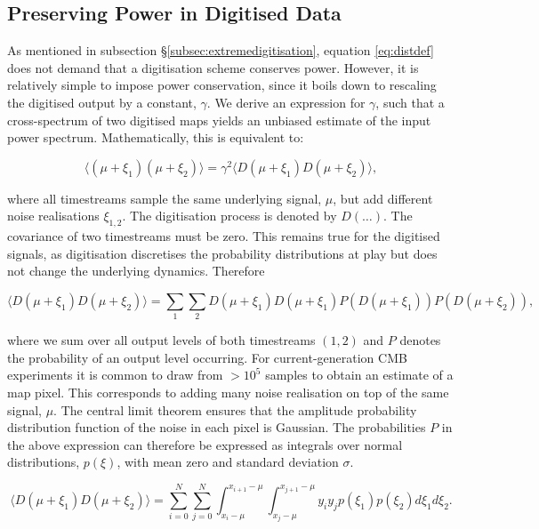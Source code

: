 \documentclass[a4paper,fleqn,usenatbib]{mnras}
\begin{document}
\subsection{Preserving Power in Digitised Data}
\label{subsec:appendixpreservepower}

As mentioned in subsection \S\ref{subsec:extremedigitisation}, equation \ref{eq:distdef} does not demand that a digitisation scheme conserves power. However, it is relatively simple to impose power conservation, since it boils down to rescaling the digitised output by a constant, $\gamma$. We derive an expression for $\gamma$, such that a cross-spectrum of two digitised maps yields an unbiased estimate of the input power spectrum. Mathematically, this is equivalent to:

\begin{equation} \label{eq:normcrosspower}
\langle (\mu + \xi_1) (\mu + \xi_2) \rangle = \gamma^2 \langle D(\mu + \xi_1) D(\mu + \xi_2) \rangle,
\end{equation}

where all timestreams sample the same underlying signal, $\mu$, but add different noise realisations $\xi_{1, 2}$. The digitisation process is denoted by $D(\dots)$. The covariance of two timestreams must be zero. This remains true for the digitised signals, as digitisation discretises the probability distributions at play but does not change the underlying dynamics. Therefore

\begin{equation}
\langle D(\mu + \xi_1) D(\mu + \xi_2) \rangle = \sum_1 \sum_2 D(\mu + \xi_1) D(\mu + \xi_1) P(D(\mu + \xi_1)) P(D(\mu + \xi_2)),
\end{equation}

where we sum over all output levels of both timestreams $(1, 2)$ and $P$ denotes the probability of an output level occurring. For current-generation CMB experiments it is common to draw from $>10^5$ samples to obtain an estimate of a map pixel. This corresponds to adding many noise realisation on top of the same signal, $\mu$. 
The central limit theorem ensures that the amplitude probability distribution function of the noise in each pixel is Gaussian. 
The probabilities $P$ in the above expression can therefore be expressed as integrals over normal distributions, $p(\xi)$, with mean zero and standard deviation $\sigma$.

\begin{equation}
\langle D(\mu + \xi_1) D(\mu + \xi_2) \rangle = \sum_{i=0}^N \sum_{j=0}^N  \int_{x_i-\mu}^{x_{i+1}-\mu} \int_{x_j-\mu}^{x_{j+1}-\mu} y_i y_j p(\xi_1) p(\xi_2) d\xi_1 d\xi_2.
\end{equation}
\end{document}
